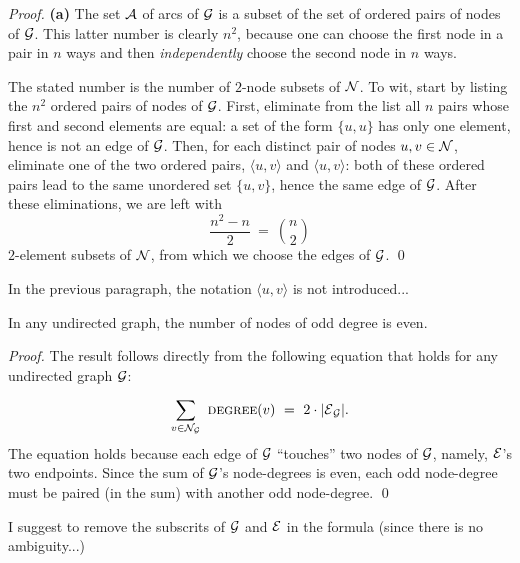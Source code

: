 \begin{proof}
{\bf (a)}
The set $\mbox{$\cal A$}$ of arcs of $\mbox{$\cal G$}$ is a subset of the set of ordered
pairs of nodes of $\mbox{$\cal G$}$.  This latter number is clearly $n^2$, because
one can choose the first node in a pair in $n$ ways and then {\em
  independently} choose the second node in $n$ ways.
\medskip

The stated number is the number of $2$-node subsets of $\mbox{$\cal N$}$.  To
wit, start by listing the $n^2$ ordered pairs of nodes of $\mbox{$\cal G$}$.
First, eliminate from the list all $n$ pairs whose first and second
elements are equal: a set of the form $\{ u,u\}$ has only one element,
hence is not an edge of $\mbox{$\cal G$}$.  Then, for each distinct pair of nodes
$u, v \in \mbox{$\cal N$}$, eliminate one of the two ordered pairs, $\langle
u,v \rangle$ and $\langle u,v \rangle$: both of these ordered pairs
lead to the same unordered set $\{ u,v\}$, hence the same edge of
$\mbox{$\cal G$}$.  After these eliminations, we are left with
\[ \frac{n^2 - n}{2} \ = \ {n \choose 2} \]
$2$-element subsets of $\mbox{$\cal N$}$, from which we choose the edges of
$\mbox{$\cal G$}$. \qed
\end{proof}
{\Denis In the previous paragraph, the notation $\langle u,v \rangle$ is not introduced...}

\begin{prop}
\label{thm:even-num-odd-degrees}
In any undirected graph, the number of nodes of odd degree is even.
\end{prop}

\begin{proof}
The result follows directly from the following equation that holds for
any undirected graph $\mbox{$\cal G$}$:

\[ \sum_{v \in {\cal N}_{\cal G}} \ \mbox{\sc degree}(v) \ = \ 2 \cdot
|\e_{\cal G}|.
\]
The equation holds because each edge of $\mbox{$\cal G$}$ ``touches'' two nodes
of $\mbox{$\cal G$}$, namely, $\mbox{$\cal E$}$'s two endpoints.  Since the sum of $\mbox{$\cal G$}$'s
node-degrees is even, each odd node-degree must be paired (in the sum)
with another odd node-degree.  \qed
\end{proof}

{\Denis I suggest to remove the subscrits of $\mbox{$\cal G$}$ and $\mbox{$\cal E$}$ in the formula (since there is no ambiguity...)}

\medskip

